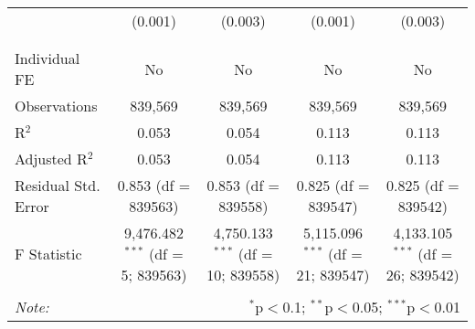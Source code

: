 \documentclass[
]{article}
\begin{document}
\begin{table}[!htbp]
{\begin{tabular}{@{\extracolsep{5pt}}lcccc}
  & (0.001) & (0.003) & (0.001) & (0.003) \\ 
  & & & & \\ 
\hline \\[-1.8ex] 
Individual FE & No & No & No & No \\ 
Observations & 839,569 & 839,569 & 839,569 & 839,569 \\ 
R$^{2}$ & 0.053 & 0.054 & 0.113 & 0.113 \\ 
Adjusted R$^{2}$ & 0.053 & 0.054 & 0.113 & 0.113 \\ 
Residual Std. Error & 0.853 (df = 839563) & 0.853 (df = 839558) & 0.825 (df = 839547) & 0.825 (df = 839542) \\ 
F Statistic & 9,476.482$^{***}$ (df = 5; 839563) & 4,750.133$^{***}$ (df = 10; 839558) & 5,115.096$^{***}$ (df = 21; 839547) & 4,133.105$^{***}$ (df = 26; 839542) \\ 
\hline 
\hline \\[-1.8ex] 
\textit{Note:}  & \multicolumn{4}{r}{$^{*}$p$<$0.1; $^{**}$p$<$0.05; $^{***}$p$<$0.01} \\ 
\end{tabular}
} 
\end{table} 
\newpage
\end{document}
